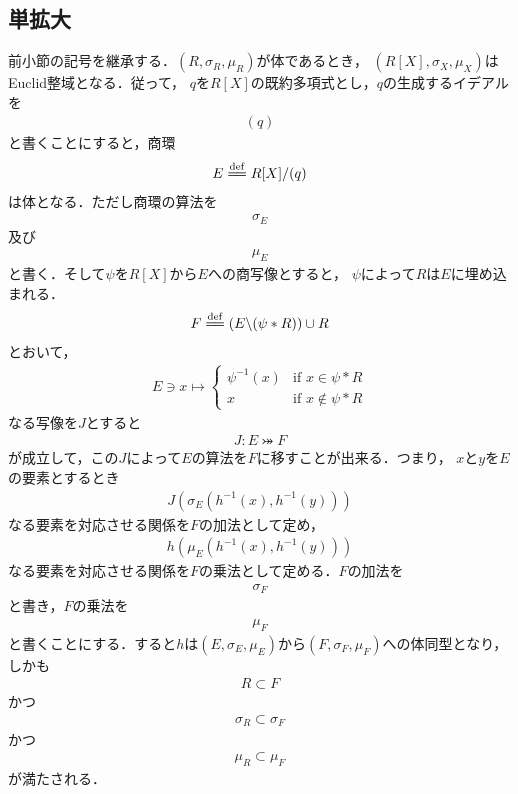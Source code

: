 \subsection{単拡大}
	前小節の記号を継承する．$(R,\sigma_R,\mu_R)$が体であるとき，
	$(R[X],\sigma_X,\mu_X)$はEuclid整域となる．従って，
	$q$を$R[X]$の既約多項式とし，$q$の生成するイデアルを
	\begin{align}
		(q)
	\end{align}
	と書くことにすると，商環
	\begin{align}
		E \defeq R[X]/(q)
	\end{align}
	は体となる．ただし商環の算法を
	\begin{align}
		\sigma_E
	\end{align}
	及び
	\begin{align}
		\mu_E
	\end{align}
	と書く．そして$\psi$を$R[X]$から$E$への商写像とすると，
	$\psi$によって$R$は$E$に埋め込まれる．
	\begin{align}
		F \defeq \left(E \backslash (\psi \ast R)\right) \cup R
	\end{align}
	とおいて，
	\begin{align}
		E \ni x \longmapsto
		\begin{cases}
			\psi^{-1}(x) & \mbox{if } x \in \psi \ast R \\
			x & \mbox{if } x \notin \psi \ast R
		\end{cases}
	\end{align}
	なる写像を$J$とすると
	\begin{align}
		J:E \bij F
	\end{align}
	が成立して，この$J$によって$E$の算法を$F$に移すことが出来る．つまり，
	$x$と$y$を$E$の要素とするとき
	\begin{align}
		J\left( \sigma_E\left(h^{-1}(x),h^{-1}(y)\right) \right)
	\end{align}
	なる要素を対応させる関係を$F$の加法として定め，
	\begin{align}
		h\left( \mu_E\left(h^{-1}(x),h^{-1}(y)\right) \right)
	\end{align}
	なる要素を対応させる関係を$F$の乗法として定める．$F$の加法を
	\begin{align}
		\sigma_F
	\end{align}
	と書き，$F$の乗法を
	\begin{align}
		\mu_F
	\end{align}
	と書くことにする．すると$h$は$(E,\sigma_E,\mu_E)$から$(F,\sigma_F,\mu_F)$への体同型となり，しかも
	\begin{align}
		R \subset F
	\end{align}
	かつ
	\begin{align}
		\sigma_R \subset \sigma_F
	\end{align}
	かつ
	\begin{align}
		\mu_R \subset \mu_F
	\end{align}
	が満たされる．
	
